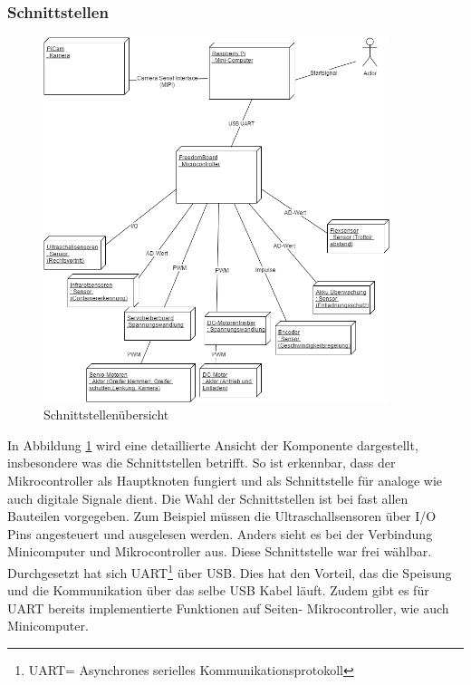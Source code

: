 \subsubsection{Schnittstellen}
\begin{figure}[H]%
\centering
\includegraphics[width=0.9\textwidth]{03_Loesungskonzept/pictures/Verteilungsdiagramm.png}
\caption{Schnittstellenübersicht}
\label{fig:Verteilungsdiagramm}
\end{figure}
In Abbildung \ref{fig:Verteilungsdiagramm} wird eine detaillierte Ansicht der Komponente dargestellt, insbesondere was die Schnittstellen betrifft. So ist erkennbar, dass der Mikrocontroller als Hauptknoten fungiert und als Schnittstelle für analoge wie auch digitale Signale dient. Die Wahl der Schnittstellen ist bei fast allen Bauteilen vorgegeben. Zum Beispiel müssen die Ultraschallsensoren über I/O Pins angesteuert und ausgelesen werden. Anders sieht es bei der Verbindung Minicomputer und Mikrocontroller aus. Diese Schnittstelle war frei wählbar. Durchgesetzt hat sich UART\footnote{UART= Asynchrones serielles Kommunikationsprotokoll} über USB. Dies hat den Vorteil, das die Speisung und die Kommunikation über das selbe USB Kabel läuft. Zudem gibt es für UART bereits implementierte Funktionen auf Seiten- Mikrocontroller, wie auch Minicomputer.
\newpage
